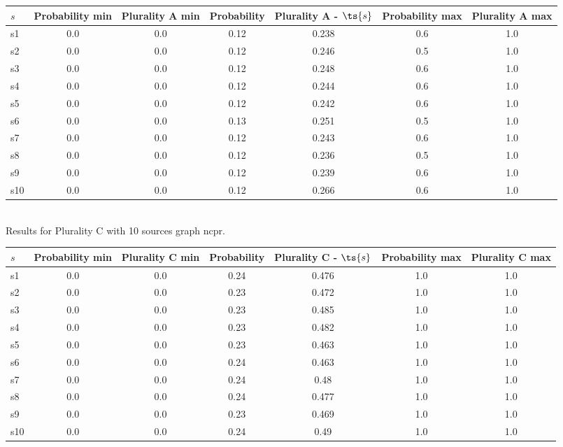 \documentclass{article}
\begin{document}
\noindent\begin{tabular}{|l|c|c|c|c|c|c|}
\hline
$s$& Probability min & Plurality A min & Probability & Plurality A - $\ts{s}$ & Probability max & Plurality A max\\
\hline
s1 &0.0 & 0.0 & 0.12 & 0.238 & 0.6 & 1.0\\
\hline
s2 &0.0 & 0.0 & 0.12 & 0.246 & 0.5 & 1.0\\
\hline
s3 &0.0 & 0.0 & 0.12 & 0.248 & 0.6 & 1.0\\
\hline
s4 &0.0 & 0.0 & 0.12 & 0.244 & 0.6 & 1.0\\
\hline
s5 &0.0 & 0.0 & 0.12 & 0.242 & 0.6 & 1.0\\
\hline
s6 &0.0 & 0.0 & 0.13 & 0.251 & 0.5 & 1.0\\
\hline
s7 &0.0 & 0.0 & 0.12 & 0.243 & 0.6 & 1.0\\
\hline
s8 &0.0 & 0.0 & 0.12 & 0.236 & 0.5 & 1.0\\
\hline
s9 &0.0 & 0.0 & 0.12 & 0.239 & 0.6 & 1.0\\
\hline
s10 &0.0 & 0.0 & 0.12 & 0.266 & 0.6 & 1.0\\
\hline
\end{tabular}\\

\noindent Results for Plurality C with 10 sources graph ncpr.

\noindent\begin{tabular}{|l|c|c|c|c|c|c|}
\hline
$s$& Probability min & Plurality C min & Probability & Plurality C - $\ts{s}$ & Probability max & Plurality C max\\
\hline
s1 &0.0 & 0.0 & 0.24 & 0.476 & 1.0 & 1.0\\
\hline
s2 &0.0 & 0.0 & 0.23 & 0.472 & 1.0 & 1.0\\
\hline
s3 &0.0 & 0.0 & 0.23 & 0.485 & 1.0 & 1.0\\
\hline
s4 &0.0 & 0.0 & 0.23 & 0.482 & 1.0 & 1.0\\
\hline
s5 &0.0 & 0.0 & 0.23 & 0.463 & 1.0 & 1.0\\
\hline
s6 &0.0 & 0.0 & 0.24 & 0.463 & 1.0 & 1.0\\
\hline
s7 &0.0 & 0.0 & 0.24 & 0.48 & 1.0 & 1.0\\
\hline
s8 &0.0 & 0.0 & 0.24 & 0.477 & 1.0 & 1.0\\
\hline
s9 &0.0 & 0.0 & 0.23 & 0.469 & 1.0 & 1.0\\
\hline
s10 &0.0 & 0.0 & 0.24 & 0.49 & 1.0 & 1.0\\
\hline
\end{tabular}\\
\end{document}

